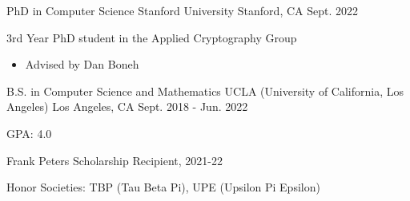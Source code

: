 

\begin{cventries}

\cventry
    {PhD in Computer Science} %
    {Stanford University} %
    {Stanford, CA} %
    {Sept. 2022} %
    {
      \begin{cvitems} %
        \item {3rd Year PhD student in the Applied Cryptography Group}
        \begin{itemize}
          \item{Advised by Dan Boneh}
        \end{itemize}
      \end{cvitems}
    }

  \cventry
    {B.S. in Computer Science and Mathematics} %
    {UCLA (University of California, Los Angeles)} %
    {Los Angeles, CA} %
    {Sept. 2018 - Jun. 2022} %
    {
      \begin{cvitems} %
        \item {GPA: 4.0}
        \item {Frank Peters Scholarship Recipient, 2021-22}
        \item{Honor Societies: TBP (Tau Beta Pi), UPE (Upsilon Pi Epsilon)}
      \end{cvitems}
    }

\end{cventries}
